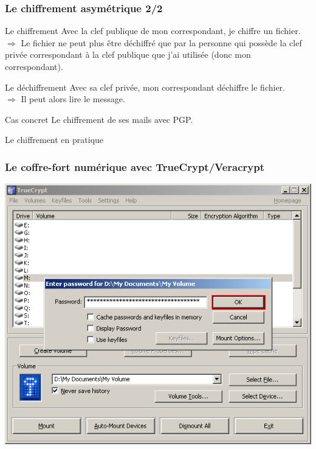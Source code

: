 \documentclass{beamer}
\begin{document}
\begin{frame}
\frametitle{Le chiffrement asymétrique 2/2}

\begin{block}{Le chiffrement}
Avec la clef publique de mon correspondant, je chiffre  un fichier.
\\$\Rightarrow$ Le fichier ne peut plus être déchiffré que par la personne qui possède la clef privée correspondant à la clef publique que j'ai utilisée (donc mon correspondant).
\end{block}

\begin{block}{Le déchiffrement}
Avec sa clef privée,  mon correspondant déchiffre le fichier.
\\
$\Rightarrow$ Il peut alors lire le message.
\end{block}

\begin{block}{Cas concret}
Le chiffrement de ses mails avec PGP.
\end{block}
\end{frame}


\begin{frame}
\begin{center}
\Huge{Le chiffrement en pratique}
\end{center}
\end{frame}

\begin{frame}
\frametitle{ Le coffre-fort numérique avec TrueCrypt/Veracrypt}

\begin{center}
\includegraphics[scale=0.4] {./images/Truecrypt18.png}
\end{center}
\end{frame}
\end{document}

